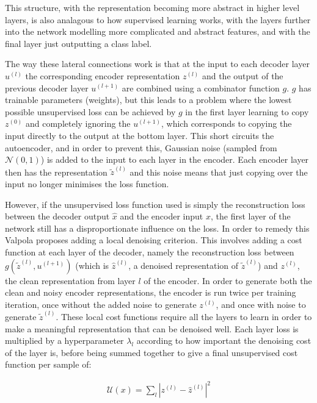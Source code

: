 This structure, with the representation becoming more abstract in higher level layers, is also analagous to how supervised learning works, with the layers 
further into the network modelling more complicated and abstract features, and with the final layer just outputting a class label.

The way these lateral connections work is that
at the input to each decoder layer $u^{(l)}$ the corresponding encoder representation $z^{(l)}$ and the output of the previous decoder layer $u^{(l+1)}$ are combined
using a combinator function $g$. $g$ has trainable parameters (weights), but this leads to a problem where the lowest possible unsupervised loss can be 
achieved by $g$ in the first layer learning to copy $z^{(0)}$ and completely ignoring the $u^{(l+1)}$, which corresponds to copying the input directly to the output at the bottom layer.
This short circuits the autoencoder, and in order to prevent this, Gaussian noise (sampled from $\mathcal{N}(0, 1)$) is added to the input to each layer 
in the encoder. Each encoder layer then has the representation $\tilde{z}^{(l)}$ and this noise means that just copying over the input no longer minimises the loss function. 

However, if the unsupervised loss function used is simply the reconstruction loss between the decoder output $\hat{x}$ and the encoder input $x$, the first layer of 
the network still has a disproportionate
influence on the loss. In order to remedy this Valpola proposes adding a local denoising criterion. This involves adding a cost function at each layer of the decoder,
namely the reconstruction loss between $g(\tilde{z}^{(l)}, u^{(l+1)})$ (which is $\hat{z}^{(l)}$, a denoised representation of $\tilde{z}^{(l)}$) and $z^{(l)}$, the clean 
representation from layer $l$ of the encoder. In order to generate both the clean and noisy encoder representations, the encoder is run twice per training iteration,
once without the added noise to generate $z^{(l)}$, and once with noise to generate $\tilde{z}^{(l)}$. These local cost functions require all the layers to learn in order
to make a meaningful representation that can be denoised well. Each layer loss is multiplied by a hyperparameter $\lambda_{l}$ according to how important the denoising cost
of the layer is, before being summed together to give a final unsupervised cost function per sample of:

\begin{align}
  \mathcal{U}(x) = \sum_{l} |z^{(l)} - \hat{z}^{(l)}|^{2}
\end{align}

